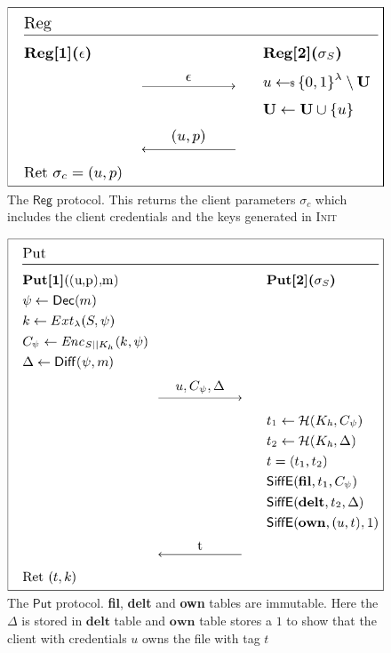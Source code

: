 \begin{figure}[H]
	\centering
	\includegraphics[scale=0.5]{reg}
	\caption{The $\mathsf{Reg}$ protocol. This returns the client parameters $\sigma_c$ which includes the client credentials and the keys generated in \textsc{Init}}	
\end{figure}

\begin{figure}[H]
	\centering
	\includegraphics[scale=0.5]{put}
	\caption{The $\mathsf{Put}$ protocol. \textbf{fil}, \textbf{delt} and \textbf{own} tables are immutable. Here the $\Delta$ is stored in $\textbf{delt}$ table and $\textbf{own}$ table stores a $1$ to show that the client with credentials $u$ owns the file with tag $t$}
	\label{fig:put}
\end{figure}

